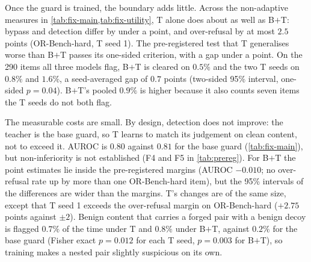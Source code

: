 Once the guard is trained, the boundary adds little. Across the non-adaptive measures in \cref{tab:fix-main,tab:fix-utility}, T alone does about as well as B$+$T: bypass and detection differ by under a point, and over-refusal by at most $2.5$ points (OR-Bench-hard, T seed 1). %
The pre-registered test that T generalises worse than B$+$T passes its one-sided criterion, with a gap under a point. On the 290 items all three models flag, B$+$T is cleared on $0.5\%$ and the two T seeds on $0.8\%$ and $1.6\%$, a seed-averaged gap of $0.7$ points (two-sided 95\% interval, one-sided $p=0.04$). B$+$T's pooled $0.9\%$ is higher because it also counts seven items the T seeds do not both flag. %

The measurable costs are small. By design, detection does not improve: the teacher is the base guard, so T learns to match its judgement on clean content, not to exceed it. AUROC is $0.80$ against $0.81$ for the base guard (\cref{tab:fix-main}), but non-inferiority is not established (F4 and F5 in \cref{tab:prereg}).
For B$+$T the point estimates lie inside the pre-registered margins (AUROC $-0.010$; no over-refusal rate up by more than one OR-Bench-hard item), but the 95\% intervals of the differences are wider than the margins. %
T's changes are of the same size, except that T seed 1 exceeds the over-refusal margin on OR-Bench-hard ($+2.75$ points against $\pm 2$).
Benign content that carries a forged pair with a benign decoy is flagged $0.7\%$ of the time under T and $0.8\%$ under B$+$T, against $0.2\%$ for the base guard (Fisher exact $p=0.012$ for each T seed, $p=0.003$ for B$+$T), so training makes a nested pair slightly suspicious on its own. %

